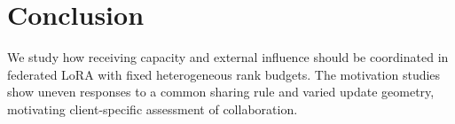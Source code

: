 \section{Conclusion}
\label{sec:conclusion}

We study how receiving capacity and external influence should be coordinated in federated LoRA with fixed heterogeneous rank budgets.
The motivation studies show uneven responses to a common sharing rule and varied update geometry, motivating client-specific assessment of collaboration.
